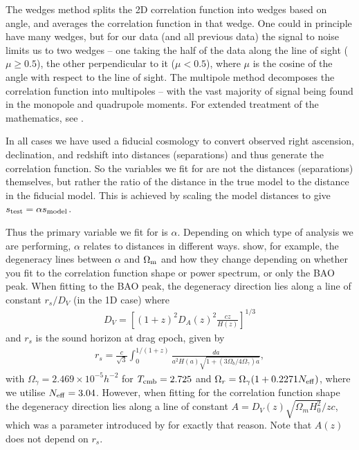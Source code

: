 \documentclass[iop,twocolappendix]{emulateapj}
\begin{document}
The wedges method splits the 2D correlation function into wedges based on angle, and averages the correlation function in that wedge.  One could in principle have many wedges, but for our data (and all previous data) the signal to noise limits us to two wedges -- one taking the half of the data along the line of sight ($\mu\ge0.5$), the other perpendicular to it ($\mu<0.5$), where $\mu$ is the cosine of the angle with respect to the line of sight. The multipole method decomposes the correlation function into multipoles -- with the vast majority of signal being found in the monopole and quadrupole moments.  For extended treatment of the mathematics, see \citet{KazinSanchezBlanton2012, KazinSanchezCuesta2013, SanchezKazinBeutler2013, XuCuesta2013}. 

In all cases we have used a fiducial cosmology to convert observed right ascension, declination, and redshift into distances (separations) and thus generate the correlation function.  So the variables we fit for are not the distances (separations) themselves, but rather the ratio of the distance in the true model to the distance in the fiducial model.  This is achieved by scaling the model distances to give $s_{\rm test}= \alpha s_{\rm model}$.   

Thus the primary variable we fit for is $\alpha$.  Depending on which type of analysis we are performing, $\alpha$ relates to  distances in different ways.  \citet{BlakeDavis2011} show, for example, the degeneracy lines between $\alpha$ and $\Omega_{\rm m}$ and how they change depending on whether you fit to the correlation function shape or power spectrum, or only the BAO peak.  When fitting to the BAO peak, the degeneracy direction lies along a line of constant $r_s/D_V$ (in the 1D case)  where 
\begin{align}
D_V=\left[ (1+z)^2 D_A(z)^2 \frac{cz}{H(z)}\right]^{1/3}
\end{align}
and $r_s$ is the sound horizon at drag epoch, given by
\begin{align}
r_s = \frac{c}{\sqrt{3}} \int_0^{1/(1+z)} \frac{da}{a^2 H(a) \sqrt{1 + (3\Omega_b/4\Omega_\gamma) a}}, \label{eq:rs}
\end{align}
with $\Omega_\gamma = 2.469\times10^{-5} h^{-2}$ for $T_{{\rm cmb}}=2.725$ and $\Omega_r = \Omega_\gamma(1 + 0.2271 N_{{\rm eff}})$, where we utilise $N_{\rm eff} = 3.04$.
However, when fitting for the correlation function shape the degeneracy direction lies along a line of constant $A=D_V(z) \sqrt{\Omega_m H_0^2} / zc$, which was a parameter introduced by \citet{Eisenstein2005} for exactly that reason.  Note that $A(z)$ does not depend on $r_s$.  
\end{document}
